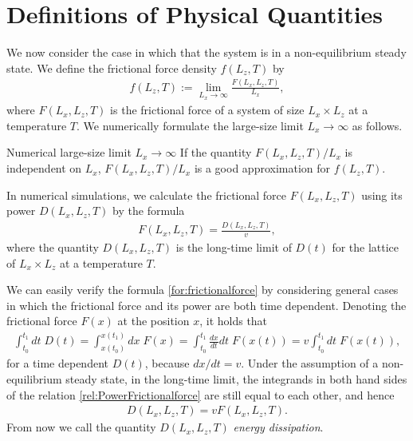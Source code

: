\section{Definitions of Physical Quantities}

We now consider the case in which that the system is in a non-equilibrium steady state. We define the frictional force density $f(L_{z}, T)$ by
\begin{align}
f(L_{z}, T):=\lim_{L_{x}\to\infty}\frac{F(L_{x}, L_{z}, T)}{L_{x}},
\end{align}
where $F(L_{x}, L_{z}, T)$ is the frictional force of a system of size $L_{x}\times L_{z}$ at a temperature $T$. We numerically formulate the  large-size limit $L_{x}\to\infty$ as follows.
\begin{itembox}{Numerical large-size limit $L_{x}\to\infty$}
	If the quantity $F(L_{x}, L_{z}, T)/L_{x}$ is independent on $L_{x}$, $F(L_{x}, L_{z}, T)/L_{x}$ is a good approximation for $f(L_{z}, T)$.
\end{itembox}
In numerical simulations, we calculate the frictional force $F(L_{x}, L_{z}, T)$ using its power $D(L_{x}, L_{z}, T)$ by the formula
\begin{align}
F(L_{x}, L_{z}, T)=\frac{D(L_{x}, L_{z}, T)}{v}\label{for:frictionalforce},
\end{align}
where the quantity $D(L_{x}, L_{z}, T)$ is the long-time limit of $D(t)$ for the lattice of $L_{x}\times L_{z}$ at a temperature $T$.

We can easily verify the formula \eqref{for:frictionalforce} by considering general cases in which the frictional force and its power are both time dependent. Denoting the frictional force $F(x)$ at the position $x$, it holds that
\begin{align}
\int_{t_{0}}^{t_{1}}dt\;D(t)=\int_{x(t_{0})}^{x(t_{1})}dx\;F(x)=\int_{t_{0}}^{t_{1}}\frac{dx}{dt}dt\;F(x(t))=v\int_{t_{0}}^{t_{1}}dt\;F(x(t))\label{rel:PowerFrictionalforce},
\end{align}
for a time dependent $D(t)$, because $dx/dt=v$. Under the assumption of a non-equilibrium steady state, in the long-time limit, the integrands in both hand sides of the relation \eqref{rel:PowerFrictionalforce} are still equal to each other, and hence 
\begin{align}
D(L_{x}, L_{z}, T)=vF(L_{x}, L_{z}, T).
\end{align}
From now we call the quantity $D(L_{x}, L_{z}, T)$ \textit{energy dissipation}.

